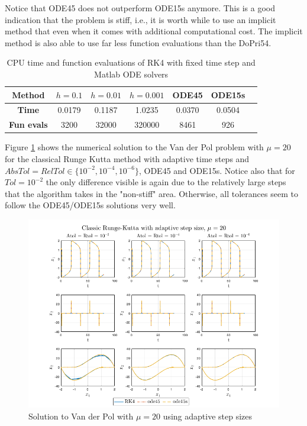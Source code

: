 Notice that ODE45 does not outperform ODE15s anymore. This is a good indication that the problem is stiff, i.e., it is worth while to use an implicit method that even when it comes with additional computational cost. The implicit method is also able to use far less function evaluations than the DoPri54. 

\begin{table}[H]
    \centering
    \caption{CPU time and function evaluations of RK4 with fixed time step and Matlab ODE solvers}
    \begin{tabular}{|c||c|c|c|c|c|c|} \hline
         \textbf{Method}    & $h=0.1$&   $h=0.01$ & $h=0.001$ & ODE45 & ODE15s     \\ \hline \hline 
         \textbf{Time}      & 0.0179   & 0.1187  &  1.0235 & 0.0370 & 0.0504   \\ \hline
         \textbf{Fun evals} & 3200    &   32000   &   320000 & 8461 & 926  \\ \hline
    \end{tabular}
    \label{tab5:mu20_fixed}
\end{table}



Figure \ref{fig5:adap_mu20} shows the numerical solution to the Van der Pol problem with $\mu = 20$ for the classical Runge Kutta method with adaptive time steps and $AbsTol=RelTol \in \{10^{-2}, 10^{-4}, 10^{-6}\}$, ODE45 and ODE15s. Notice also that for $Tol = 10^{-2}$ the only difference visible is again due to the relatively large steps that the algorithm takes in the "non-stiff" area. Otherwise, all tolerances seem to follow the ODE45/ODE15s solutions very well.

\begin{figure}[H]
    \centering
    \includegraphics[width=\textwidth]{graphics/opg5/mu20_adap.png}
    \caption{Solution to Van der Pol with $\mu = 20$ using adaptive step sizes}
    \label{fig5:adap_mu20}
\end{figure}

